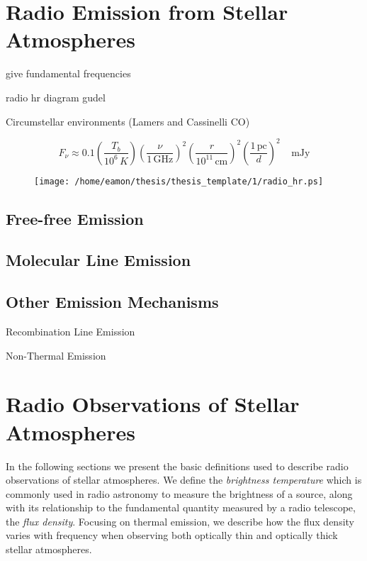 
\section{Radio Emission from Stellar Atmospheres} 
give fundamental frequencies

radio hr diagram gudel

Circumstellar environments (Lamers and Cassinelli CO)

\begin{equation}
F_{\nu}\approx 0.1\left(\frac{T_{b}}{10^6\,K}\right)\left(\frac{\nu}{1\,\mathrm{GHz}}\right)^2\left(\frac{r}{10^{11}\,\mathrm{cm}}\right)^2\left(\frac{1\,\mathrm{pc}}{d}\right)^2\ \ \ \ \ \mathrm{mJy}
\end{equation}
\citep{gudel_2002}

\begin{figure}[hbt!]
\centering 
          \texttt{[image: /home/eamon/thesis/thesis\_template/1/radio\_hr.ps]}
\caption[]{}
\label{fig:1.5.3}
\end{figure}
\subsection{Free-free Emission}\label{sec:1.4.1}
\subsection{Molecular Line Emission}\label{sec:1.4.2}
\subsection{Other Emission Mechanisms}\label{sec:1.4.2}
Recombination Line Emission

Non-Thermal Emission
\section{Radio Observations of Stellar Atmospheres}
In the following sections we present the basic definitions used to describe radio observations of stellar atmospheres. We define the \textit{brightness temperature} which is commonly used in radio astronomy to measure the brightness of a source, along with its relationship to the fundamental quantity measured by a radio telescope, the \textit{flux density}. Focusing on thermal emission, we describe how the flux density varies with frequency when observing both optically thin and optically thick stellar atmospheres.

